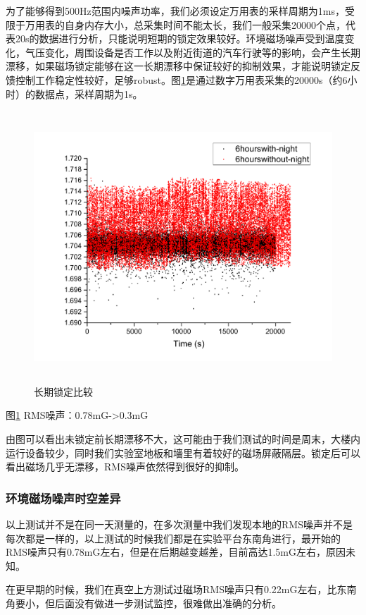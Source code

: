 \documentclass[onecolumn,a4paper,10pt]{article}
\begin{document}
为了能够得到500Hz范围内噪声功率，我们必须设定万用表的采样周期为1ms，受限于万用表的自身内存大小，总采集时间不能太长，我们一般采集20000个点，代表20s的数据进行分析，只能说明短期的锁定效果较好。环境磁场噪声受到温度变化，气压变化，周围设备是否工作以及附近街道的汽车行驶等的影响，会产生长期漂移，如果磁场锁定能够在这一长期漂移中保证较好的抑制效果，才能说明锁定反馈控制工作稳定性较好，足够robust。图\ref{fig:Multimeter3}是通过数字万用表采集的20000s（约6小时）的数据点，采样周期为1s。

\begin{figure}[htbp]
\centering
\includegraphics[height=4in]{Longtime}
\caption{长期锁定比较}
\label{fig:Multimeter3}
\end{figure}

图\ref{fig:Multimeter3} RMS噪声：0.78mG->0.3mG

由图可以看出未锁定前长期漂移不大，这可能由于我们测试的时间是周末，大楼内运行设备较少，同时我们实验室地板和墻里有着较好的磁场屏蔽隔层。锁定后可以看出磁场几乎无漂移，RMS噪声依然得到很好的抑制。

\subsubsection{环境磁场噪声时空差异}

以上测试并不是在同一天测量的，在多次测量中我们发现本地的RMS噪声并不是每次都是一样的，以上测试的时候我们都是在实验平台东南角进行，最开始的RMS噪声只有0.78mG左右，但是在后期越变越差，目前高达1.5mG左右，原因未知。

在更早期的时候，我们在真空上方测试过磁场RMS噪声只有0.22mG左右，比东南角要小，但后面没有做进一步测试监控，很难做出准确的分析。
\end{document}
